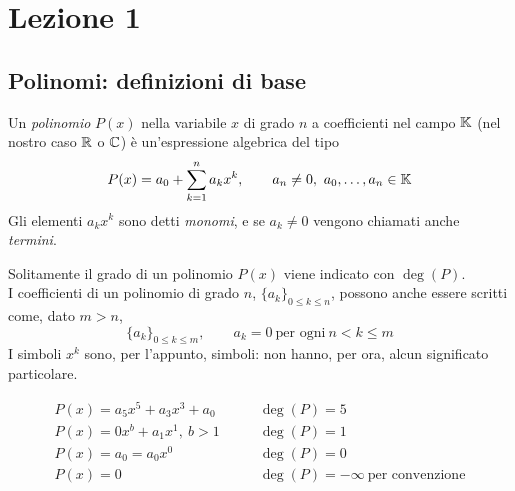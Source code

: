 \section{Lezione 1}
\subsection{Polinomi: definizioni di base}
\begin{definition}
    \label{def:1.1}
    Un \emph{polinomio} $P(x)$ nella variabile $x$ di grado $n$ a coefficienti nel campo $\amsbb{K}$ (nel nostro caso $\amsbb{R}$ o $\amsbb{C}$) è un'espressione algebrica del tipo
    \[
    P(x) = a_0 + \sum_{k=1}^n a_k x^k, \qquad a_n\ne 0, \ a_0, \dots, a_n\in\amsbb{K}
    \]
    Gli elementi $a_k x^k$ sono detti \emph{monomi}, e se $a_k\ne 0$ vengono chiamati anche \emph{termini}.
\end{definition}
\begin{remark}
    Solitamente il grado di un polinomio $P(x)$ viene indicato con $\deg(P)$.\\
    I coefficienti di un polinomio di grado $n$, $\{a_k\}_{0\le k\le n}$, possono anche essere scritti come, dato $m>n$,
    \[
    \{a_k\}_{0\le k \le m}, \qquad a_k = 0 \ \text{per ogni} \ n<k\le m
    \]
    I simboli $x^k$ sono, per l'appunto, simboli: non hanno, per ora, alcun significato particolare.
\end{remark}
\begin{example}
    \[
    \begin{split}
    P(x) = a_5x^5+a_3x^3+a_0 &\qquad \deg(P) = 5\\
    P(x) = 0x^b+a_1x^1, \ b>1 & \qquad \deg(P)=1\\
    P(x) = a_0 = a_0x^0 &\qquad \deg(P)=0\\
    P(x)=0 &\qquad \deg(P)=-\infty \ \text{per convenzione}
    \end{split}
    \]
\end{example}
